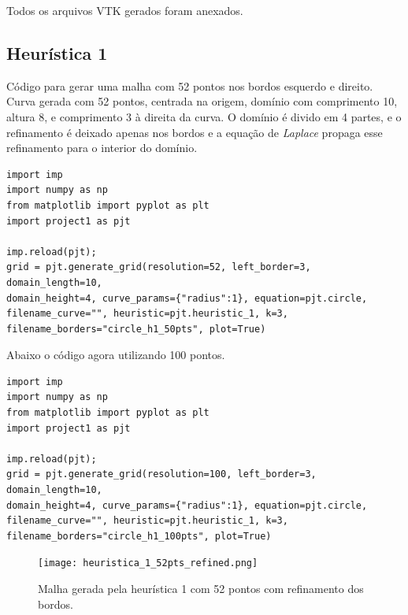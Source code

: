 \documentclass[a4paper]{article}
\begin{document}
Todos os arquivos VTK gerados foram anexados.

\subsection{Heurística 1}

Código para gerar uma malha com 52 pontos nos bordos esquerdo e direito. Curva gerada com 52 pontos, centrada na origem, domínio com comprimento 10, altura 8, e comprimento 3 à direita da curva. O domínio é divido em 4 partes, e o refinamento é deixado apenas nos bordos e a equação de \textit{Laplace} propaga esse refinamento para o interior do domínio.


\begin{verbatim}
import imp
import numpy as np
from matplotlib import pyplot as plt
import project1 as pjt

imp.reload(pjt);  
grid = pjt.generate_grid(resolution=52, left_border=3, domain_length=10, 
domain_height=4, curve_params={"radius":1}, equation=pjt.circle, 
filename_curve="", heuristic=pjt.heuristic_1, k=3, filename_borders="circle_h1_50pts", plot=True)
\end{verbatim}

Abaixo o código agora utilizando 100 pontos.
\begin{verbatim}
import imp
import numpy as np
from matplotlib import pyplot as plt
import project1 as pjt

imp.reload(pjt);  
grid = pjt.generate_grid(resolution=100, left_border=3, domain_length=10, 
domain_height=4, curve_params={"radius":1}, equation=pjt.circle, 
filename_curve="", heuristic=pjt.heuristic_1, k=3, filename_borders="circle_h1_100pts", plot=True)
\end{verbatim}


%



\begin{figure}[H]
	\centering
	\texttt{[image: heuristica\_1\_52pts\_refined.png]}
	\label{fig:heuristic1_50pts_refined} 
	\caption[caption]{Malha gerada pela heurística 1 com 52 pontos com refinamento dos bordos.}
\end{figure}
\end{document}
